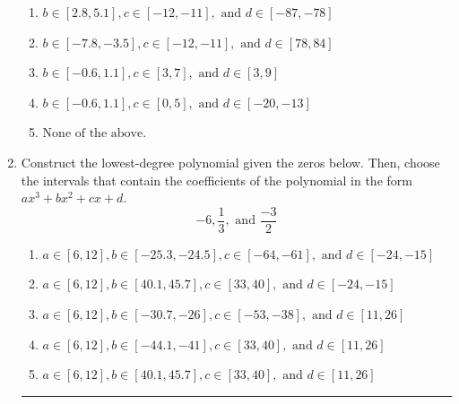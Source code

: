 \documentclass[14pt]{extbook}
\newcommand{\litem}[1]{\item#1\hspace*{-1cm}\rule{\textwidth}{0.4pt}}
\begin{document}
\begin{enumerate}
{\begin{enumerate}[label=\Alph*.]
\item \( b \in [2.8, 5.1], c \in [-12, -11], \text{ and } d \in [-87, -78] \)
\item \( b \in [-7.8, -3.5], c \in [-12, -11], \text{ and } d \in [78, 84] \)
\item \( b \in [-0.6, 1.1], c \in [3, 7], \text{ and } d \in [3, 9] \)
\item \( b \in [-0.6, 1.1], c \in [0, 5], \text{ and } d \in [-20, -13] \)
\item \( \text{None of the above.} \)

\end{enumerate} }
\litem{
Construct the lowest-degree polynomial given the zeros below. Then, choose the intervals that contain the coefficients of the polynomial in the form $ax^3+bx^2+cx+d$.\[ -6, \frac{1}{3}, \text{ and } \frac{-3}{2} \]\begin{enumerate}[label=\Alph*.]
\item \( a \in [6, 12], b \in [-25.3, -24.5], c \in [-64, -61], \text{ and } d \in [-24, -15] \)
\item \( a \in [6, 12], b \in [40.1, 45.7], c \in [33, 40], \text{ and } d \in [-24, -15] \)
\item \( a \in [6, 12], b \in [-30.7, -26], c \in [-53, -38], \text{ and } d \in [11, 26] \)
\item \( a \in [6, 12], b \in [-44.1, -41], c \in [33, 40], \text{ and } d \in [11, 26] \)
\item \( a \in [6, 12], b \in [40.1, 45.7], c \in [33, 40], \text{ and } d \in [11, 26] \)


\end{enumerate}}
\end{enumerate}
\end{document}
